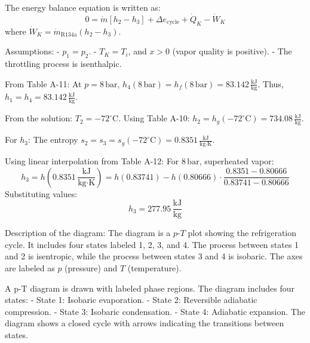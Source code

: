 The energy balance equation is written as:  
\[
0 = \dot{m} \left[ h_2 - h_3 \right] + \Delta e_{\text{cycle}} + \dot{Q}_K - \dot{W}_K
\]  
where \( \dot{W}_K = \dot{m}_{\text{R134a}} \left( h_2 - h_3 \right) \).  

Assumptions:  
- \( p_1 = p_2 \).  
- \( T_K = T_i \), and \( x > 0 \) (vapor quality is positive).  
- The throttling process is isenthalpic.  

From Table A-11:  
At \( p = 8 \, \text{bar} \), \( h_4(8 \, \text{bar}) = h_f(8 \, \text{bar}) = 83.142 \, \frac{\text{kJ}}{\text{kg}} \).  
Thus, \( h_1 = h_4 = 83.142 \, \frac{\text{kJ}}{\text{kg}} \).  

From the solution:  
\( T_2 = -72^\circ\text{C} \).  
Using Table A-10:  
\( h_2 = h_g(-72^\circ\text{C}) = 734.08 \, \frac{\text{kJ}}{\text{kg}} \).  

For \( h_3 \):  
The entropy \( s_2 = s_3 = s_g(-72^\circ\text{C}) = 0.8351 \, \frac{\text{kJ}}{\text{kg·K}} \).  

Using linear interpolation from Table A-12:  
For \( 8 \, \text{bar} \), superheated vapor:  
\[
h_3 = h \left( 0.8351 \, \frac{\text{kJ}}{\text{kg·K}} \right) = h \left( 0.83741 \right) - h \left( 0.80666 \right) \cdot \frac{0.8351 - 0.80666}{0.83741 - 0.80666}
\]  
Substituting values:  
\[
h_3 = 277.95 \, \frac{\text{kJ}}{\text{kg}}
\]  

Description of the diagram:  
The diagram is a \( p \)-\( T \) plot showing the refrigeration cycle. It includes four states labeled 1, 2, 3, and 4. The process between states 1 and 2 is isentropic, while the process between states 3 and 4 is isobaric. The axes are labeled as \( p \) (pressure) and \( T \) (temperature).

A p-T diagram is drawn with labeled phase regions. The diagram includes four states:  
- State 1: Isobaric evaporation.  
- State 2: Reversible adiabatic compression.  
- State 3: Isobaric condensation.  
- State 4: Adiabatic expansion.  
The diagram shows a closed cycle with arrows indicating the transitions between states.